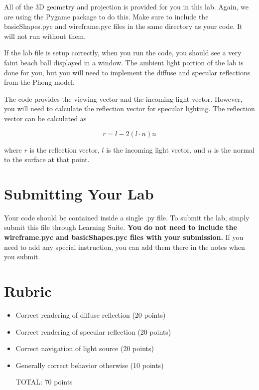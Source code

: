 \documentclass[11pt]{article}
\begin{document}
All of the 3D geometry and projection is provided for you in this lab. Again, we are using the Pygame package to do this. Make sure to include the basicShapes.pyc and wireframe.pyc files in the same directory as your code. It will not run without them.

If the lab file is setup correctly, when you run the code, you should see a very faint beach ball displayed in a window. The ambient light portion of the lab is done for you, but you will need to implement the diffuse and specular reflections from the Phong model.

The code provides the viewing vector and the incoming light vector. However, you will need to calculate the reflection vector for specular lighting. The reflection vector can be calculated as

$$ r = l - 2(l \cdot n) n $$

\noindent where $r$ is the reflection vector, $l$ is the incoming light vector, and $n$ is the normal to the surface at that point.

\section*{Submitting Your Lab}

Your code should be contained inside a single .py file. To submit the lab, simply submit this file through Learning Suite. \textbf{You do not need to include the wireframe.pyc and basicShapes.pyc files with your submission.} If you need to add any special instruction, you can add them there in the notes when you submit.

\divider

\section*{Rubric}

\begin{itemize}
	\item	Correct rendering of diffuse reflection (20 points)
    \item   Correct rendering of specular reflection (20 points)
    \item   Correct navigation of light source (20 points)
    \item   Generally correct behavior otherwise (10 points)

TOTAL: 70 points

\end{itemize}


\end{document}

